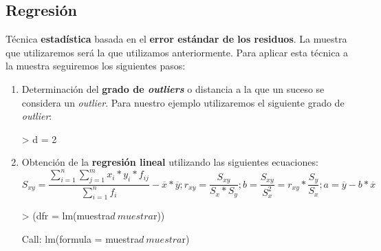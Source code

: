 \documentclass [a4paper] {article}
\begin{document}
\subsection{Regresión}
Técnica \textbf{estadística} basada en el \textbf{error estándar de los residuos}. La muestra que utilizaremos será la que
utilizamos anteriormente.
Para aplicar esta técnica a la muestra seguiremos los siguientes pasos:
\begin{enumerate}
	\item Determinación del \textbf{grado de \textit{outliers}} o distancia a la que un suceso se
		  considera un \textit{outlier}. Para nuestro ejemplo utilizaremos el siguiente grado
	      de \textit{outlier}:
\begin{Schunk}
\begin{Sinput}
> d = 2
\end{Sinput}
\end{Schunk}
	\item Obtención de la \textbf{regresión lineal} utilizando las siguientes ecuaciones:
	      \begin{equation*}
			S_{xy} = \frac{\sum_{i=1}^{n} \sum_{j=1}^{m} x_{i}*y_{i}*f_{ij}}{\sum_{i=1}^{n}f_{i}} - \overline{x} * \overline{y};
			r_{xy} = \frac{S_{xy}}{S_{x}*S_{y}};
			b = \frac{S_{xy}}{S_{x}^2} = r_{xy}*\frac{S_{y}}{S_{x}}; 
			a = \overline{y} - b*\overline{x}
		  \end{equation*}
\begin{Schunk}
\begin{Sinput}
> (dfr = lm(muestra$d~muestra$r))
\end{Sinput}
\begin{Soutput}
Call:
lm(formula = muestra$d ~ muestra$r)


\end{Soutput}
\end{Schunk}
\end{enumerate}
\end{document}
